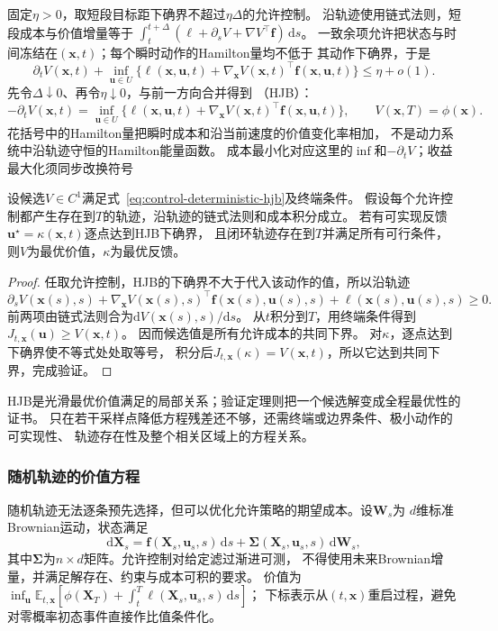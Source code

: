 固定$\eta>0$，取短段目标距下确界不超过$\eta\Delta$的允许控制。
沿轨迹使用链式法则，短段成本与价值增量等于
$\int_t^{t+\Delta}(\ell+\partial_sV+\nabla V^\top\bm f)\,\mathrm ds$。
一致余项允许把状态与时间冻结在$(\bm x,t)$；每个瞬时动作的Hamilton量均不低于
其动作下确界，于是
\[
  \partial_tV(\bm x,t)+
  \inf_{\bm u\in U}\{\ell(\bm x,\bm u,t)+
    \nabla_{\bm x}V(\bm x,t)^\top\bm f(\bm x,\bm u,t)\}
  \leq\eta+o(1).
\]
先令$\Delta\downarrow0$、再令$\eta\downarrow0$，与前一方向合并得到
（HJB）：
\begin{equation}
  -\partial_tV(\bm x,t)=
  \inf_{\bm u\in U}
    \{\ell(\bm x,\bm u,t)+
      \nabla_{\bm x}V(\bm x,t)^\top\bm f(\bm x,\bm u,t)\},
  \qquad V(\bm x,T)=\phi(\bm x).
  \label{eq:control-deterministic-hjb}
\end{equation}
花括号中的Hamilton量把瞬时成本和沿当前速度的价值变化率相加，
不是动力系统中沿轨迹守恒的Hamilton能量函数。
成本最小化对应这里的$\inf$和$-\partial_tV$；收益最大化须同步改换符号

\begin{theorem}[确定性HJB验证定理]
\label{thm:control-hjb-verification}
设候选$V\in C^1$满足式~\eqref{eq:control-deterministic-hjb}及终端条件。
假设每个允许控制都产生存在到$T$的轨迹，沿轨迹的链式法则和成本积分成立。
若有可实现反馈$\bm u^\star=\kappa(\bm x,t)$逐点达到HJB下确界，
且闭环轨迹存在到$T$并满足所有可行条件，则$V$为最优价值，$\kappa$为最优反馈。
\end{theorem}
\begin{proof}
任取允许控制，HJB的下确界不大于代入该动作的值，所以沿轨迹
\[
  \partial_sV(\bm x(s),s)+
  \nabla_{\bm x}V(\bm x(s),s)^\top
    \bm f(\bm x(s),\bm u(s),s)
  +\ell(\bm x(s),\bm u(s),s)\geq0.
\]
前两项由链式法则合为$\mathrm dV(\bm x(s),s)/\mathrm ds$。
从$t$积分到$T$，用终端条件得到$J_{t,\bm x}(\bm u)\geq V(\bm x,t)$。
因而候选值是所有允许成本的共同下界。
对$\kappa$，逐点达到下确界使不等式处处取等号，
积分后$J_{t,\bm x}(\kappa)=V(\bm x,t)$，所以它达到共同下界，完成验证。
\end{proof}
HJB是光滑最优价值满足的局部关系；验证定理则把一个候选解变成全程最优性的证书。
只在若干采样点降低方程残差还不够，还需终端或边界条件、极小动作的可实现性、
轨迹存在性及整个相关区域上的方程关系。

\subsubsection{随机轨迹的价值方程}

随机轨迹无法逐条预先选择，但可以优化允许策略的期望成本。设$\bm W_s$为
$d$维标准Brownian运动，状态满足
\begin{equation}
  \mathrm d\bm X_s=\bm f(\bm X_s,\bm u_s,s)\,\mathrm ds
    +\bm\Sigma(\bm X_s,\bm u_s,s)\,\mathrm d\bm W_s,
  \label{eq:control-stochastic-dynamics}
\end{equation}
其中$\bm\Sigma$为$n\times d$矩阵。允许控制对给定滤过渐进可测，
不得使用未来Brownian增量，并满足解存在、约束与成本可积的要求。
价值为
$\inf_{\bm u}\mathbb E_{t,\bm x}[
\phi(\bm X_T)+\int_t^T\ell(\bm X_s,\bm u_s,s)\,\mathrm ds]$；
下标表示从$(t,\bm x)$重启过程，避免对零概率初态事件直接作比值条件化。

